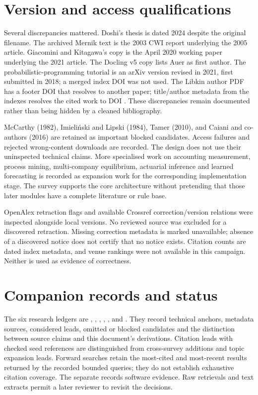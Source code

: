 \section{Version and access qualifications}

Several discrepancies mattered. Doshi's thesis is dated 2024 despite the
original filename. The archived Mernik text is the 2003 CWI report underlying
the 2005 article. Giacomini and Kitagawa's copy is the April 2020 working paper
underlying the 2021 article. The Docling v5 copy lists Auer as first author.
The probabilistic-programming tutorial is an arXiv version revised in 2021,
first submitted in 2018; a merged index DOI was not used. The Libkin author
PDF has a footer DOI that resolves to another paper; title/author metadata
from the indexes resolves the cited work to DOI
. These discrepancies remain documented rather
than being hidden by a cleaned bibliography.

McCarthy (1982), Imieliński and Lipski (1984), Tamer (2010), and Caiani and
co-authors (2016) are retained as important blocked candidates. Access failures
and rejected wrong-content downloads are recorded. The design does not use
their uninspected technical claims. More specialised work on accounting
measurement, process mining, multi-company equilibrium, actuarial inference
and learned forecasting is recorded as expansion work for the corresponding
implementation stage. The survey supports the core architecture without
pretending that those later modules have a complete literature or rule base.

OpenAlex retraction flags and available Crossref correction/version relations
were inspected alongside local versions. No reviewed source was excluded for
a discovered retraction. Missing correction metadata is marked unavailable;
absence of a discovered notice does not certify that no notice exists.
Citation counts are dated index metadata, and venue rankings were not available
in this campaign. Neither is used as evidence of correctness.

\section{Companion records and status}

The six research ledgers are ,
, ,
, , and
. They record technical anchors, metadata sources,
considered leads, omitted or blocked candidates and the distinction between
source claims and this document's derivations. Citation leads with checked
seed references are distinguished from cross-survey additions and topic
expansion leads. Forward searches retain the most-cited and most-recent
results returned by the recorded bounded queries; they do not establish
exhaustive citation coverage. The separate 
records software evidence. Raw retrievals and text extracts permit a later
reviewer to revisit the decisions.

